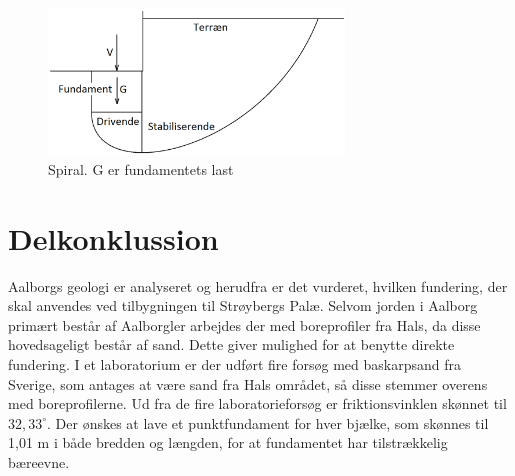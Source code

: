 \begin{figure}[htbp]
	\centering
	\includegraphics[width=0.7\textwidth]{billeder/spiral.png}
	\caption{Spiral. G er fundamentets last}
	\label{fig:haha}
\end{figure}

\section{Delkonklussion}
Aalborgs geologi er analyseret og herudfra er det vurderet, hvilken fundering, der skal anvendes ved tilbygningen til Strøybergs Palæ. Selvom jorden i Aalborg primært består af Aalborgler arbejdes der med boreprofiler fra Hals, da disse hovedsageligt består af sand. Dette giver mulighed for at benytte direkte fundering. I et laboratorium er der udført fire forsøg med baskarpsand fra Sverige, som antages at være sand fra Hals området, så disse stemmer overens med boreprofilerne. Ud fra de fire laboratorieforsøg er friktionsvinklen skønnet til $32,\!33^{\circ}$. Der ønskes at lave et punktfundament for hver bjælke, som skønnes til 1,01 m i både bredden og længden, for at fundamentet har tilstrækkelig bæreevne.